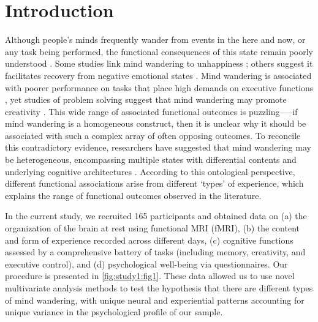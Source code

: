 \section{Introduction}
\label{study1:intro}

Although people's minds frequently wander from events in the here and now, or any task being performed, the functional consequences of this state remain poorly understood \cite{Mittner2016,SeliTiCS2016,SmallwoodFrontiers2013}.
Some studies link mind wandering to unhappiness
\cite{Killingsworth2010};
others suggest it facilitates recovery from negative emotional states
\cite{PoerioFrontiers2016,RubyPlos2013}.
Mind wandering is associated with poorer performance on tasks that place high demands on executive functions
\cite{McVay2009,MrazekJoEP2012},
yet studies of problem solving suggest that mind wandering may promote creativity
\cite{Baird2012,Smeekens2016}.
This wide range of associated functional outcomes is puzzling--—if mind wandering is a homogeneous construct, then it is unclear why it should be associated with such a complex array of often opposing outcomes. To reconcile this contradictory evidence, researchers have suggested that mind wandering may be heterogeneous, encompassing multiple states with differential contents and underlying cognitive architectures \cite{SmallwoodFrontiers2013}. According to this ontological perspective, different functional associations arise from different `types' of experience, which explains the range of functional outcomes observed in the literature.

In the current study, we recruited 165 participants and obtained data on (a) the organization of the brain at rest using functional MRI (fMRI), (b) the content and form of experience recorded across different days, (c) cognitive functions assessed by a comprehensive battery of tasks (including memory, creativity, and executive control), and (d) psychological well-being via questionnaires. Our procedure is presented in \cref{fig:study1:fig1}. These data allowed us to use novel multivariate analysis methods to test the hypothesis that there are different types of mind wandering, with unique neural and experiential patterns accounting for unique variance in the psychological profile of our sample.

